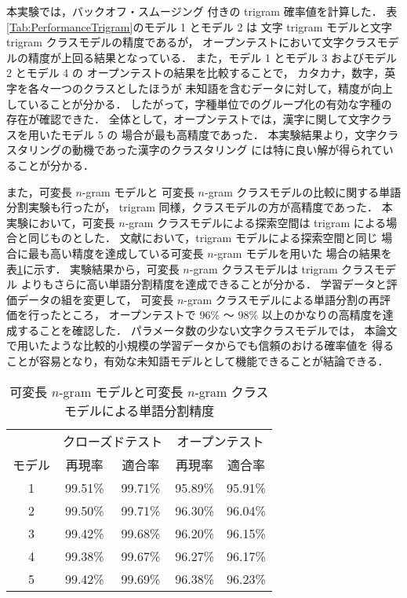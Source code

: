 本実験では，バックオフ・スムージング\cite{Katz87}
付きの trigram 確率値を計算した．
表\ref{Tab:PerformanceTrigram}のモデル 1 とモデル 2 は
文字 trigram モデルと文字 trigram クラスモデルの精度であるが，
オープンテストにおいて文字クラスモデルの精度が上回る結果となっている．
また，モデル 1 とモデル 3 およびモデル 2 とモデル 4 の
オープンテストの結果を比較することで，
カタカナ，数字，英字を各々一つのクラスとしたほうが
未知語を含むデータに対して，精度が向上していることが分かる．
したがって，字種単位でのグループ化の有効な字種の存在が確認できた．
全体として，オープンテストでは，漢字に関して文字クラスを用いたモデル 5 の
場合が最も高精度であった．
本実験結果より，文字クラスタリングの動機であった漢字のクラスタリング
には特に良い解が得られていることが分かる．

また，可変長 $n$-gram モデル\cite{Oda99a,Oda99b}と
可変長 $n$-gram クラスモデルの比較に関する単語分割実験も行ったが，
trigram 同様，クラスモデルの方が高精度であった．
本実験において，可変長 $n$-gram クラスモデルによる探索空間は
trigram による場合と同じものとした．
文献\cite{Oda99b}において，trigram モデルによる探索空間と同じ
場合に最も高い精度を達成している可変長 $n$-gram モデルを用いた
場合の結果を表\ref{Tab:PerformancePPMBackOff}に示す．
実験結果から，可変長 $n$-gram クラスモデルは trigram クラスモデル
よりもさらに高い単語分割精度を達成できることが分かる．
学習データと評価データの組を変更して，
可変長 $n$-gram クラスモデルによる単語分割の再評価を行ったところ，
オープンテストで 96\% 〜 98\% 以上のかなりの高精度を達成することを確認した．
パラメータ数の少ない文字クラスモデルでは，
本論文で用いたような比較的小規模の学習データからでも信頼のおける確率値を
得ることが容易となり，有効な未知語モデルとして機能できることが結論できる．
\begin{table}[hbt]
\begin{center}
\caption{可変長 $n$-gram モデルと可変長 $n$-gram クラスモデルによる単語分割精度}
\label{Tab:PerformancePPMBackOff}
{\tabcolsep 1.5mm
\begin{tabular}{c||c|c|c|c}
\hline
\hline
 & \multicolumn{2}{|c|}{クローズドテスト} & \multicolumn{2}{c}{オープンテスト}\\
\cline{2-5}
モデル & 再現率 & 適合率 & 再現率 & 適合率\\
\hline
1 & 99.51\% & 99.71\% & 95.89\% & 95.91\%\\
2 & 99.50\% & 99.71\% & 96.30\% & 96.04\%\\
3 & 99.42\% & 99.68\% & 96.20\% & 96.15\%\\
4 & 99.38\% & 99.67\% & 96.27\% & 96.17\%\\
5 & 99.42\% & 99.69\% & 96.38\% & 96.23\%\\
\hline
\end{tabular}
}
\end{center}
\end{table}

